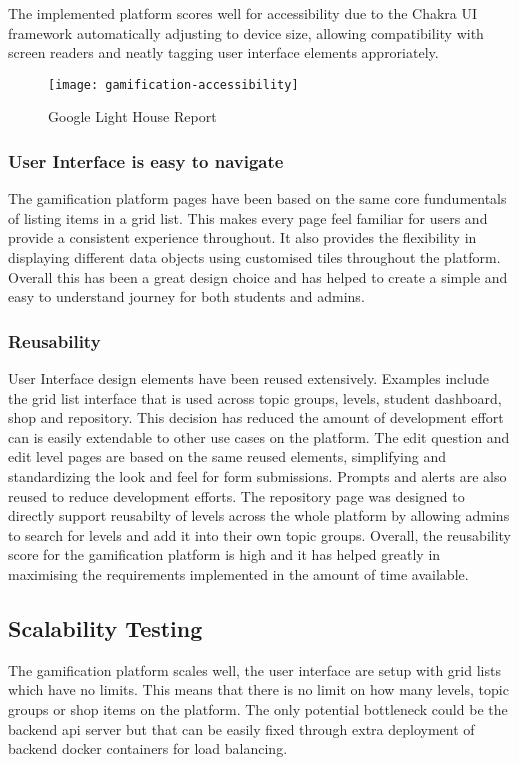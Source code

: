 The implemented platform scores well for accessibility due to the Chakra UI framework automatically adjusting to device size, allowing compatibility with screen readers and neatly tagging user interface elements approriately.

\begin{figure}[h!]
    \texttt{[image: gamification-accessibility]}
    \centering
    \caption{Google Light House Report}
\end{figure}

\subsubsection{User Interface is easy to navigate}
The gamification platform pages have been based on the same core fundumentals of listing items in a grid list. This makes every page feel familiar for users and provide a consistent experience throughout. It also provides the flexibility in displaying different data objects using customised tiles throughout the platform. Overall this has been a great design choice and has helped to create a simple and easy to understand journey for both students and admins.

\subsubsection{Reusability}
User Interface design elements have been reused extensively. Examples include the grid list interface that is used across topic groups, levels, student dashboard, shop and repository. This decision has reduced the amount of development effort can is easily extendable to other use cases on the platform. The edit question and edit level pages are based on the same reused elements, simplifying and standardizing the look and feel for form submissions. Prompts and alerts are also reused to reduce development efforts. The repository page was designed to directly support reusabilty of levels across the whole platform by allowing admins to search for levels and add it into their own topic groups. Overall, the reusability score for the gamification platform is high and it has helped greatly in maximising the requirements implemented in the amount of time available.

\subsection{Scalability Testing}

The gamification platform scales well, the user interface are setup with grid lists which have no limits. This means that there is no limit on how many levels, topic groups or shop items on the platform. The only potential bottleneck could be the backend api server but that can be easily fixed through extra deployment of backend docker containers for load balancing. 

